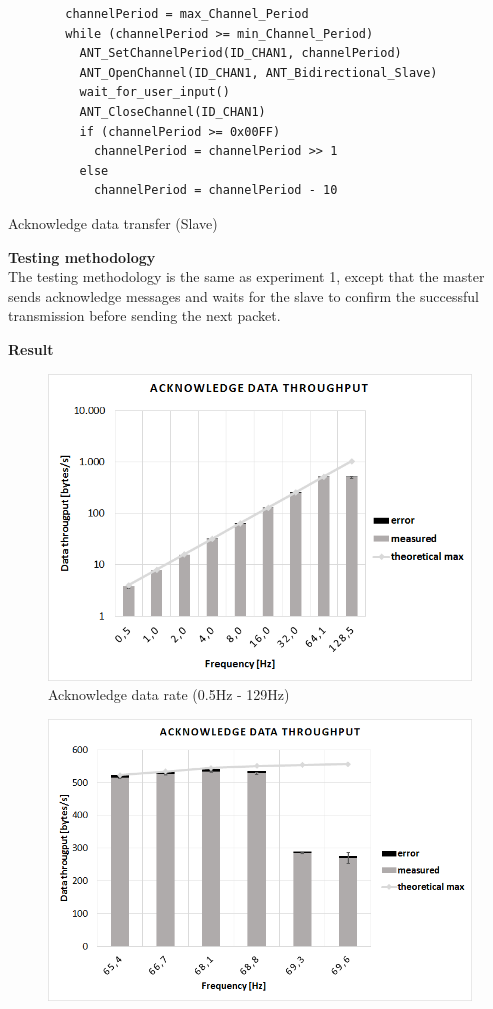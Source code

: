 \begin{description}
	\begin{code}[H]
		\begin{verbatim}
		channelPeriod = max_Channel_Period
		while (channelPeriod >= min_Channel_Period) 
		  ANT_SetChannelPeriod(ID_CHAN1, channelPeriod)
		  ANT_OpenChannel(ID_CHAN1, ANT_Bidirectional_Slave)
		  wait_for_user_input()
		  ANT_CloseChannel(ID_CHAN1)
		  if (channelPeriod >= 0x00FF)
		    channelPeriod = channelPeriod >> 1
		  else
		    channelPeriod = channelPeriod - 10
		\end{verbatim}
		\caption{Acknowledge data transfer (Slave)}\label{lst:sExp3}
	\end{code}
	\item{\textbf{Testing methodology}} \hfill \\ The testing methodology is the same as experiment 1, except that the master sends acknowledge messages and waits for the slave to confirm the successful transmission before sending the next packet. 
	\newpage
	\item{\textbf{Result}} \hfill \\
	\begin{figure}[H]
		\centering
		\includegraphics[scale=0.5]{content/images/exp3_norm.png}
		\caption{Acknowledge data rate (0.5Hz - 129Hz)}\label{fig:exp4norm}
	\end{figure}
	\begin{figure}[H]
		\centering
		\includegraphics[scale=0.5]{content/images/exp3_detail.png}

\end{figure}
\end{description}
